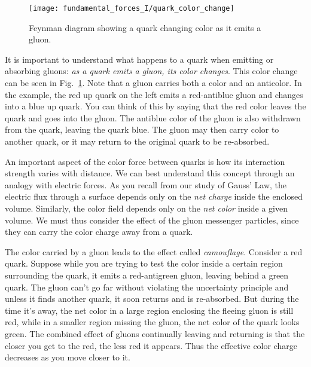\begin{figure}[tbp]
\begin{center}
\begin{minipage}{10cm}
\begin{center}
\texttt{[image: fundamental\_forces\_I/quark\_color\_change]}
\caption{Feynman diagram showing a quark changing color as it emits a
  gluon.}
\label{fig:quark_color_change}
\end{center}
\end{minipage}
\end{center}
\end{figure}

It is important to understand what happens to a quark when emitting or
absorbing gluons: {\em as a quark emits a gluon, its color changes}.
This color change can be seen in Fig.~\ref{fig:quark_color_change}.
Note that a gluon carries both a color and an anticolor.  In the
example, the red up quark on the left emits a red-antiblue gluon and
changes into a blue up quark. You can think of this by saying that the
red color leaves the quark and goes into the gluon.  The antiblue
color of the gluon is also withdrawn from the quark, leaving the quark
blue. The gluon may then carry color to another quark, or it may
return to the original quark to be re-absorbed.

An important aspect of the color force between quarks is how its
interaction strength varies with distance.  We can best understand
this concept through an analogy with electric forces.  As you recall
from our study of Gauss' Law, the electric flux through a surface
depends only on the {\em net charge} inside the enclosed volume.
Similarly, the color field depends only on the {\em net color} inside
a given volume.  We must thus consider the effect of the gluon
messenger particles, since they can carry the color charge away from a
quark.

The color carried by a gluon leads to the effect called
{\em camouflage}. Consider a red quark.  Suppose while you are trying to
test the color inside a certain region surrounding the quark, it emits
a red-antigreen gluon, leaving behind a green quark.  The gluon can't
go far without violating the uncertainty principle and unless it finds
another quark, it soon returns and is re-absorbed.  But during the time
it's away, the net color in a large region enclosing the fleeing gluon
is still red, while in a smaller region missing the gluon, the net
color of the quark looks green. The combined effect of gluons
continually leaving and returning is that the closer you get to the
red, the less red it appears.  Thus the effective color charge
decreases as you move closer to it.

